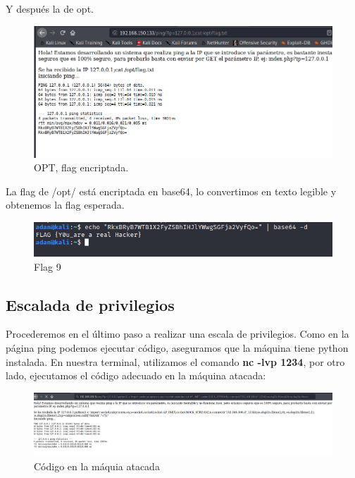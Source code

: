 \documentclass[12pt,twoside]{article}
\begin{document}
\newpage

Y después la de opt.

\begin{figure}[h]
    \centering
    \includegraphics[scale=0.4]{./imagenes/cat_flag_opt}
    \caption{OPT, flag encriptada.}
\end{figure}

La flag de /opt/ está encriptada en base64, lo convertimos en texto legible y obtenemos la flag esperada.

\begin{figure}[h]
    \centering
    \includegraphics[scale=0.4]{./imagenes/flag_opt}
    \caption{Flag 9}
\end{figure}

\newpage 

\subsection{Escalada de privilegios}
Procederemos en el último paso a realizar una escala de privilegios. Como en la página ping podemos ejecutar código, aseguramos que la máquina tiene python instalada. En nuestra terminal, utilizamos el comando \textbf{nc -lvp 1234}, por otro lado, ejecutamos el código adecuado en la máquina atacada: 

\begin{figure}[h]
    \centering
    \includegraphics[scale=0.25]{./imagenes/ejecucion_codigo}
    \caption{Código en la máquia atacada}
\end{figure}
\end{document}
